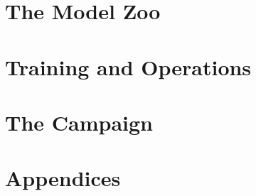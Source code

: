 \documentclass[11pt,oneside]{book}
\begin{document}
\part{The Model Zoo}





\part{Training and Operations}





\part{The Campaign}



\appendix
\part{Appendices}



\end{document}
